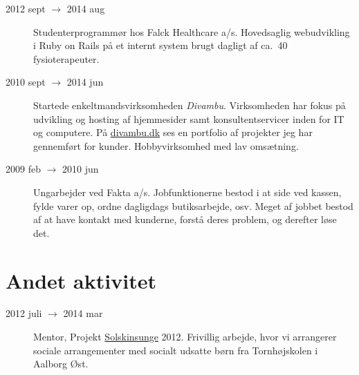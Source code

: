 \documentclass[margin,line,a4paper]{resume}
\begin{document}
\begin{resume}
\begin{description}
  \item[2012 sept $\rightarrow$ 2014 aug] Studenterprogrammør hos Falck
    Healthcare a/s. Hovedsaglig webudvikling i Ruby on Rails på et internt
    system brugt dagligt af ca.\ 40 fysioterapeuter.

  \item[2010 sept $\rightarrow$ 2014 jun] Startede enkeltmandsvirksomheden
    \emph{Divambu}. Virksomheden har fokus på udvikling og hosting af
    hjemmesider samt konsultentservicer inden for IT og computere. På
    \url{divambu.dk} ses en portfolio af projekter jeg har gennemført for
    kunder. Hobbyvirksomhed med lav omsætning.

  \item[2009 feb $\rightarrow$ 2010 jun] Ungarbejder ved Fakta
    a/s. Jobfunktionerne bestod i at side ved kassen, fylde varer op,
    ordne dagligdags butiksarbejde, osv. Meget af jobbet bestod af at have
    kontakt med kunderne, forstå deres problem, og derefter løse det.
\end{description}

\section{\mysidestyle Andet aktivitet}\vspace{1mm}
\begin{description}
  \item[2012 juli $\rightarrow$ 2014 mar] Mentor, Projekt
    \href{http://www.urk.dk/solskinsunge/}{Solskinsunge} 2012. Frivillig
    arbejde, hvor vi arrangerer sociale arrangementer med socialt udsatte
    børn fra Tornhøjskolen i Aalborg Øst.
\end{description}



\end{resume}
\end{document}
